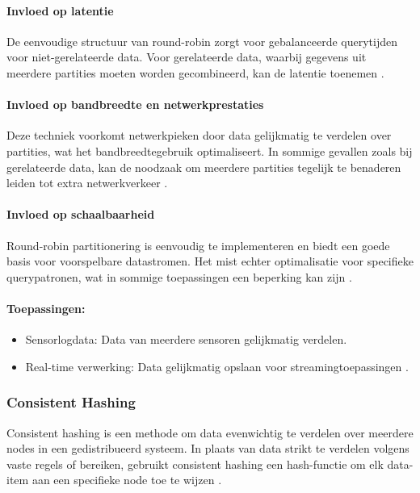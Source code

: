 \paragraph{Invloed op latentie} 
De eenvoudige structuur van round-robin zorgt voor gebalanceerde querytijden voor niet-gerelateerde data. Voor gerelateerde data, waarbij gegevens uit meerdere partities moeten worden gecombineerd, kan de latentie toenemen \autocite{Mahmud2020}.
 
\paragraph{Invloed op bandbreedte en netwerkprestaties} 
Deze techniek voorkomt netwerkpieken door data gelijkmatig te verdelen over partities, wat het bandbreedtegebruik optimaliseert. In sommige gevallen zoals bij gerelateerde data, kan de noodzaak om meerdere partities tegelijk te benaderen leiden tot extra netwerkverkeer \autocite{Mahmud2020}.
 
\paragraph{Invloed op schaalbaarheid} 
Round-robin partitionering is eenvoudig te implementeren en biedt een goede basis voor voorspelbare datastromen. Het mist echter optimalisatie voor specifieke querypatronen, wat in sommige toepassingen een beperking kan zijn \autocite{Mahmud2020, Ponnusamy2024}.
 
\paragraph{Toepassingen:}
\begin{itemize}
    \item Sensorlogdata: Data van meerdere sensoren gelijkmatig verdelen.
    \item Real-time verwerking: Data gelijkmatig opslaan voor streamingtoepassingen \autocite{Mahmud2020}.
\end{itemize}

\subsubsection{Consistent Hashing}
Consistent hashing is een methode om data evenwichtig te verdelen over meerdere nodes in een gedistribueerd systeem. In plaats van data strikt te verdelen volgens vaste regels of bereiken, gebruikt consistent hashing een hash-functie om elk data-item aan een specifieke node toe te wijzen \autocite{Kleppmann2017}.

